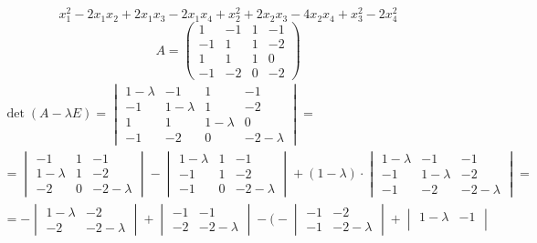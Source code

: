 $$ x_1^2 - 2x_1x_2 + 2x_1x_3 - 2x_1x_4 + x_2^2 + 2x_2x_3 - 4x_2x_4 + x_3^2 - 2x_4^2 $$
$$ A =
\begin{pmatrix}
	1 & -1 & 1 & -1 \\
    -1 & 1 & 1 & -2 \\
    1 & 1 & 1 & 0 \\
    -1 & -2 & 0 & -2
\end{pmatrix} $$
\begin{multline*}
    \det(A - \lambda E) =
    \begin{vmatrix}
        1 - \lambda & -1 & 1 & -1 \\
        -1 & 1 - \lambda & 1 & -2 \\
        1 & 1 & 1 - \lambda & 0 \\
        -1 & -2 & 0 & -2 - \lambda
    \end{vmatrix} = \\
    =
    \begin{vmatrix}
        -1 & 1 & -1 \\
        1 - \lambda & 1 & -2 \\
        -2 & 0 & -2 - \lambda
    \end{vmatrix} -
    \begin{vmatrix}
        1 - \lambda & 1 & -1 \\
        -1 & 1 & -2 \\
        -1 & 0 & -2 - \lambda
    \end{vmatrix} + (1 - \lambda) \cdot
    \begin{vmatrix}
        1 - \lambda & -1 & -1 \\
        -1 & 1 - \lambda & -2 \\
        -1 & -2 & -2 - \lambda
    \end{vmatrix} = \\
    = -
    \begin{vmatrix}
    	1 - \lambda & -2 \\
        -2 & -2 - \lambda
    \end{vmatrix} +
    \begin{vmatrix}
    	-1 & -1 \\
        -2 & -2 - \lambda
    \end{vmatrix} - \bigg( -
    \begin{vmatrix}
    	-1 & -2 \\
        -1 & -2 - \lambda
    \end{vmatrix} +
    \begin{vmatrix}
    	1 - \lambda & -1 \\

\end{vmatrix}
\end{multline*}

